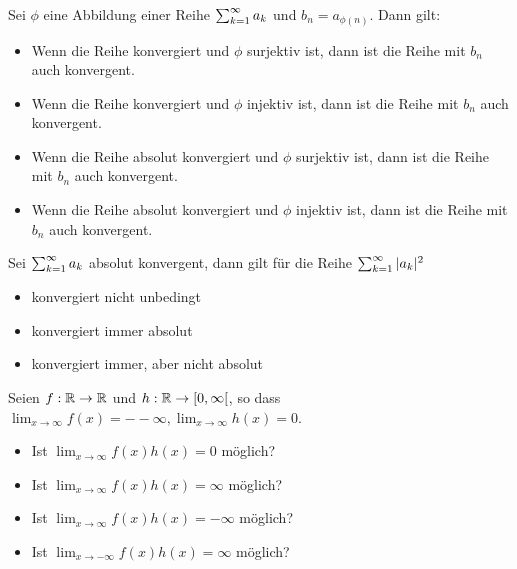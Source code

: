 Sei $\phi$ eine Abbildung einer Reihe $\sum_{k = 1}^{\infty} a_k$ und $b_n = a_{\phi(n)}$. Dann gilt:
\begin{itemize}
    \item[$\square$]
    Wenn die Reihe konvergiert und $\phi$ surjektiv ist, dann ist die Reihe mit $b_n$ auch konvergent.
    \item[$\square$]
    Wenn die Reihe konvergiert und $\phi$ injektiv ist, dann ist die Reihe mit $b_n$ auch konvergent.
    \item[$\square$]
    Wenn die Reihe absolut konvergiert und $\phi$ surjektiv ist, dann ist die Reihe mit $b_n$ auch konvergent.
    \item[\rlap{\raisebox{0.3ex}{\hspace{0.4ex}\tiny \ding{52}}}$\square$]
    Wenn die Reihe absolut konvergiert und $\phi$ injektiv ist, dann ist die Reihe mit $b_n$ auch konvergent.
\end{itemize}

Sei $\sum_{k = 1}^{\infty} a_k$ absolut konvergent, dann gilt für die Reihe $\sum_{k = 1}^{\infty} |a_k|^2$
\begin{itemize}
    \item[$\square$]
    konvergiert nicht unbedingt
    \item[\rlap{\raisebox{0.3ex}{\hspace{0.4ex}\tiny \ding{52}}}$\square$]
    konvergiert immer absolut
    \item[$\square$]
    konvergiert immer, aber nicht absolut
\end{itemize}


Seien $f : \mathbb{R} \to \mathbb{R}$ und $h : \mathbb{R} \to [0, \infty[$, so dass $\lim_{x \to \infty}f(x) = - -\infty, \lim_{x \to \infty} h(x) = 0$.
\begin{itemize}
    \item[\rlap{\raisebox{0.3ex}{\hspace{0.4ex}\tiny \ding{52}}}$\square$]
    Ist $\lim_{x \to \infty} f(x)h(x) = 0$ möglich?
    \item[$\square$]
    Ist $\lim_{x \to \infty} f(x)h(x) = \infty$ möglich?
    \item[\rlap{\raisebox{0.3ex}{\hspace{0.4ex}\tiny \ding{52}}}$\square$]
    Ist $\lim_{x \to \infty} f(x)h(x) = - \infty$ möglich?
    \item[\rlap{\raisebox{0.3ex}{\hspace{0.4ex}\tiny \ding{52}}}$\square$]
    Ist $\lim_{x \to -\infty} f(x)h(x) = \infty$ möglich?
\end{itemize}

